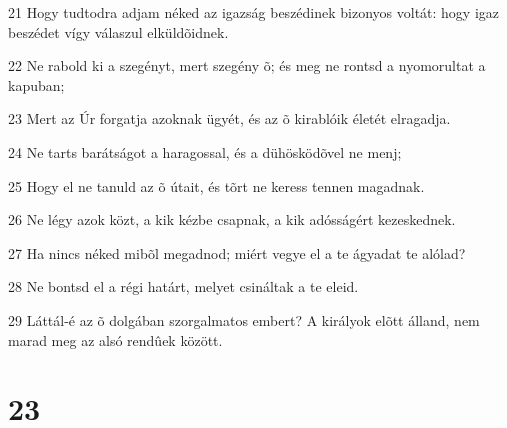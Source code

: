 \par 21 Hogy tudtodra adjam néked az igazság beszédinek bizonyos voltát: hogy igaz beszédet vígy válaszul elküldõidnek.
\par 22 Ne rabold ki a szegényt, mert szegény õ; és meg ne rontsd a nyomorultat a kapuban;
\par 23 Mert az Úr forgatja azoknak ügyét, és az õ kirablóik életét elragadja.
\par 24 Ne tarts barátságot a haragossal, és a dühösködõvel ne menj;
\par 25 Hogy el ne tanuld az õ útait, és tõrt ne keress tennen magadnak.
\par 26 Ne légy azok közt, a kik kézbe csapnak, a kik adósságért kezeskednek.
\par 27 Ha nincs néked mibõl megadnod; miért vegye el a te ágyadat te alólad?
\par 28 Ne bontsd el a régi  határt, melyet csináltak a te eleid.
\par 29 Láttál-é az õ dolgában szorgalmatos embert? A királyok elõtt álland, nem marad meg az alsó rendûek között.

\chapter{23}

